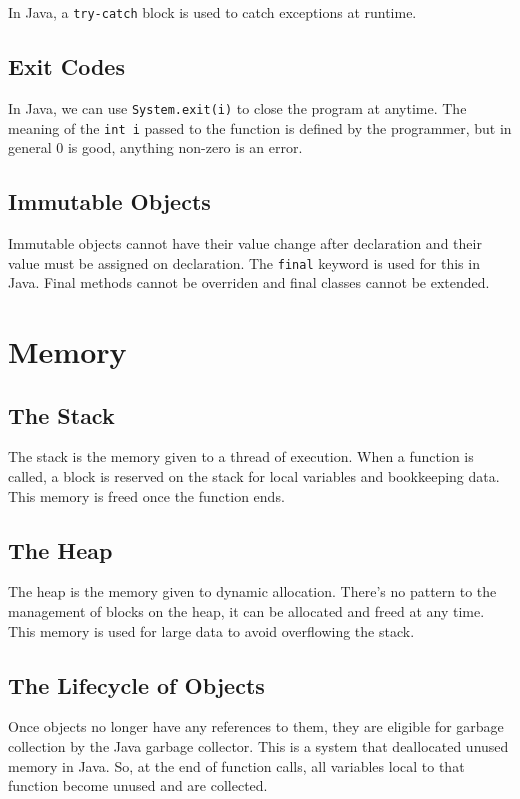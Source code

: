 \documentclass[a4paper, 12pt, twoside]{article}
\begin{document}
In Java, a \texttt{try-catch} block is used to catch exceptions
at runtime.

\subsection{Exit Codes}

In Java, we can use \texttt{System.exit(i)} to close the program at
anytime. The meaning of the \texttt{int i} passed to the function
is defined by the programmer, but in general 0 is good, anything
non-zero is an error.

\subsection{Immutable Objects}

Immutable objects cannot have their value change after declaration
and their value must be assigned on declaration. The \texttt{final}
keyword is used for this in Java. Final methods cannot be overriden
and final classes cannot be extended.

\section{Memory}

\subsection{The Stack}

The stack is the memory given to a thread of execution.
When a function is called, a block is reserved on the stack for
local variables and bookkeeping data. This memory is freed once
the function ends.

\subsection{The Heap}

The heap is the memory given to dynamic allocation. There's no
pattern to the management of blocks on the heap, it can be
allocated and freed at any time. This memory is used for large
data to avoid overflowing the stack.

\subsection{The Lifecycle of Objects}

Once objects no longer have any references to them, they are
eligible for garbage collection by the Java garbage collector.
This is a system that deallocated unused memory in Java. So,
at the end of function calls, all variables local to that function
become unused and are collected.
\end{document}
